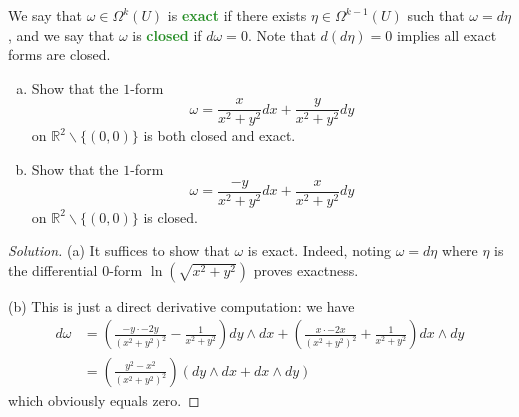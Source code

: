 \documentclass[10pt]{scrartcl}
\providecommand{\RR}{\mathbb R}
\providecommand{\ii}{\item}
\providecommand{\setdiff}{\smallsetminus}
\newenvironment{soln}{\begin{proof}[Solution]}{\end{proof}}
\providecommand{\vocab}[1]{{\textbf{\textcolor{ForestGreen}{#1}}}}
\begin{document}
\begin{problem}
	We say that $\omega\in\Omega^k(U)$ is \vocab{exact} if
	there exists $\eta\in\Omega^{k-1}(U)$ such that $\omega = d\eta$,
	and we say that $\omega$ is \vocab{closed} if $d\omega = 0$.
	Note that $d(d\eta) = 0$ implies all exact forms are closed.
	\begin{enumerate}[(a)]
		\ii Show that the $1$-form
		\[\omega = \frac{x}{x^2+y^2}dx + \frac{y}{x^2+y^2}dy\]
		on $\RR^2\setdiff\{(0,0)\}$ is both closed and exact.
		\ii Show that the $1$-form
		\[\omega = \frac{-y}{x^2+y^2}dx + \frac{x}{x^2+y^2}dy\]
		on $\RR^2\setdiff\{(0,0)\}$ is closed.
	\end{enumerate}
\end{problem}

\begin{soln}
	(a) It suffices to show that $\omega$ is exact. Indeed, noting
	$\omega = d\eta$ where $\eta$ is the differential
	$0$-form $\ln(\sqrt{x^2+y^2})$ proves exactness.
	
	(b) This is just a direct derivative computation: we have
	\begin{align*}
		d\omega& = \left(\frac{-y\cdot -2y}{(x^2+y^2)^2}
		- \frac{1}{x^2+y^2}\right)dy\wedge dx + \left(\frac{x\cdot-2x}
		{(x^2+y^2)^2}+\frac{1}{x^2+y^2}\right)dx\wedge dy\\
		&= \left(\frac{y^2-x^2}{(x^2+y^2)^2}\right)(dy\wedge dx+dx\wedge dy)
	\end{align*}
	which obviously equals zero.
\end{soln}
\end{document}
